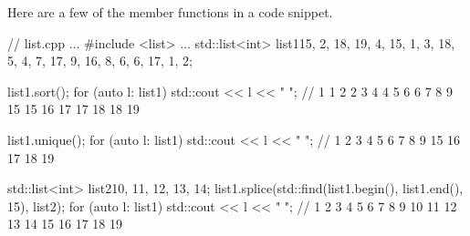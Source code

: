 Here are a few of the member functions in a code snippet.


\begin{cpp}
// list.cpp
...
#include <list>
...
std::list<int> list1{15, 2, 18, 19, 4, 15, 1, 3, 18, 5,
	                  4, 7, 17, 9, 16, 8, 6, 6, 17, 1, 2};
	                  
list1.sort();
for (auto l: list1) std::cout << l << " ";
	// 1 1 2 2 3 4 4 5 6 6 7 8 9 15 15 16 17 17 18 18 19

list1.unique();
for (auto l: list1) std::cout << l << " ";
	// 1 2 3 4 5 6 7 8 9 15 16 17 18 19

std::list<int> list2{10, 11, 12, 13, 14};
list1.splice(std::find(list1.begin(), list1.end(), 15), list2);
for (auto l: list1) std::cout << l << " ";
	// 1 2 3 4 5 6 7 8 9 10 11 12 13 14 15 16 17 18 19
\end{cpp}


